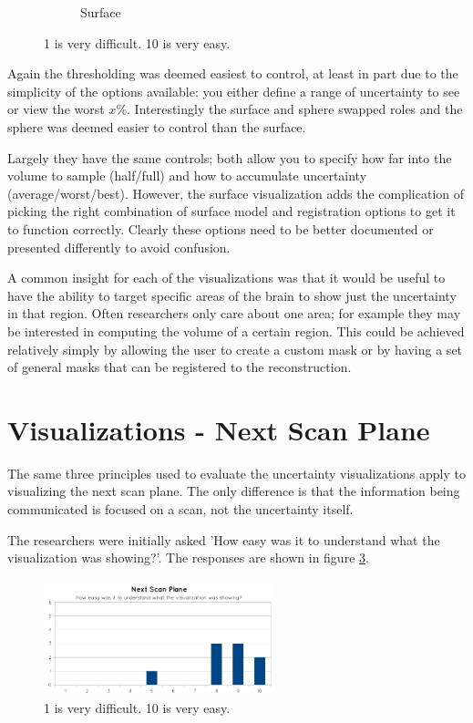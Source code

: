 \begin{figure}[H]
\begin{subfigure}[b]{0.32\textwidth}
    \caption*{Surface}
    \label{fig:eval_visualization_q3_surface}  
  \end{subfigure}
  \caption{1 is very difficult. 10 is very easy.}\label{fig:eval_visualization_q3}
\end{figure}

Again the thresholding was deemed easiest to control, at least in part due to the simplicity of the options available: you either define a range of uncertainty to see or view the worst $x\%$. Interestingly the surface and sphere swapped roles and the sphere was deemed easier to control than the surface.

Largely they have the same controls; both allow you to specify how far into the volume to sample (half/full) and how to accumulate uncertainty (average/worst/best). However, the surface visualization adds the complication of picking the right combination of surface model and registration options to get it to function correctly. Clearly these options need to be better documented or presented differently to avoid confusion.

A common insight for each of the visualizations was that it would be useful to have the ability to target specific areas of the brain to show just the uncertainty in that region. Often researchers only care about one area; for example they may be interested in computing the volume of a certain region. This could be achieved relatively simply by allowing the user to create a custom mask or by having a set of general masks that can be registered to the reconstruction.

\newpage
\section{Visualizations - Next Scan Plane}
The same three principles used to evaluate the uncertainty visualizations apply to visualizing the next scan plane. The only difference is that the information being communicated is focused on a scan, not the uncertainty itself.

The researchers were initially asked 'How easy was it to understand what the visualization was showing?'. The responses are shown in figure \ref{fig:eval_next_scan_plane_q1}.

\begin{figure}[h]
    \centering
  \includegraphics[width=0.6\textwidth]{images/evaluation/graph_next_scan_plane_1.png}
    \caption{1 is very difficult. 10 is very easy.}\label{fig:eval_next_scan_plane_q1}
\end{figure}

